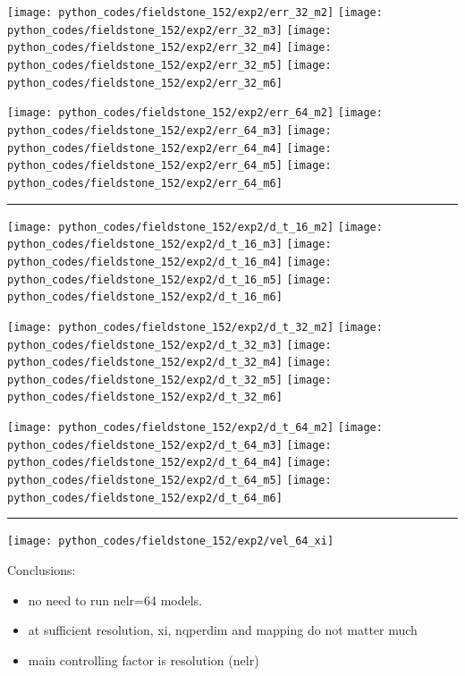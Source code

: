 \noindent
\texttt{[image: python\_codes/fieldstone\_152/exp2/err\_32\_m2]}
\texttt{[image: python\_codes/fieldstone\_152/exp2/err\_32\_m3]}
\texttt{[image: python\_codes/fieldstone\_152/exp2/err\_32\_m4]}
\texttt{[image: python\_codes/fieldstone\_152/exp2/err\_32\_m5]}
\texttt{[image: python\_codes/fieldstone\_152/exp2/err\_32\_m6]}

\noindent
\texttt{[image: python\_codes/fieldstone\_152/exp2/err\_64\_m2]}
\texttt{[image: python\_codes/fieldstone\_152/exp2/err\_64\_m3]}
\texttt{[image: python\_codes/fieldstone\_152/exp2/err\_64\_m4]}
\texttt{[image: python\_codes/fieldstone\_152/exp2/err\_64\_m5]}
\texttt{[image: python\_codes/fieldstone\_152/exp2/err\_64\_m6]}

\hrule

\noindent
\texttt{[image: python\_codes/fieldstone\_152/exp2/d\_t\_16\_m2]}
\texttt{[image: python\_codes/fieldstone\_152/exp2/d\_t\_16\_m3]}
\texttt{[image: python\_codes/fieldstone\_152/exp2/d\_t\_16\_m4]}
\texttt{[image: python\_codes/fieldstone\_152/exp2/d\_t\_16\_m5]}
\texttt{[image: python\_codes/fieldstone\_152/exp2/d\_t\_16\_m6]}

\noindent
\texttt{[image: python\_codes/fieldstone\_152/exp2/d\_t\_32\_m2]}
\texttt{[image: python\_codes/fieldstone\_152/exp2/d\_t\_32\_m3]}
\texttt{[image: python\_codes/fieldstone\_152/exp2/d\_t\_32\_m4]}
\texttt{[image: python\_codes/fieldstone\_152/exp2/d\_t\_32\_m5]}
\texttt{[image: python\_codes/fieldstone\_152/exp2/d\_t\_32\_m6]}

\noindent
\texttt{[image: python\_codes/fieldstone\_152/exp2/d\_t\_64\_m2]}
\texttt{[image: python\_codes/fieldstone\_152/exp2/d\_t\_64\_m3]}
\texttt{[image: python\_codes/fieldstone\_152/exp2/d\_t\_64\_m4]}
\texttt{[image: python\_codes/fieldstone\_152/exp2/d\_t\_64\_m5]}
\texttt{[image: python\_codes/fieldstone\_152/exp2/d\_t\_64\_m6]}

\hrule

\texttt{[image: python\_codes/fieldstone\_152/exp2/vel\_64\_xi]}


Conclusions:
\begin{itemize}
\item no need to run nelr=64 models.
\item at sufficient resolution, xi, nqperdim and mapping do not matter 
much 
\item main controlling factor is resolution (nelr)
\end{itemize}









